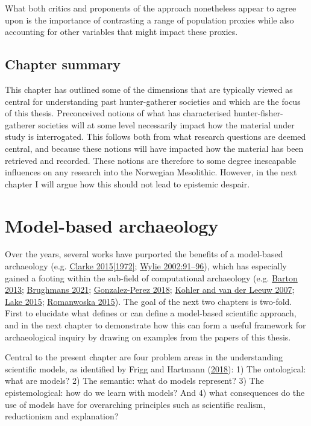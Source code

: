 \documentclass[
  12pt,
  a4paper,
  oneside]{book}
\begin{document}
What both critics and proponents of the approach nonetheless appear to agree upon is the importance of contrasting a range of population proxies while also accounting for other variables that might impact these proxies.

\hypertarget{chapter-summary-1}{%
\section{Chapter summary}\label{chapter-summary-1}}

This chapter has outlined some of the dimensions that are typically viewed as central for understanding past hunter-gatherer societies and which are the focus of this thesis. Preconceived notions of what has characterised hunter-fisher-gatherer societies will at some level necessarily impact how the material under study is interrogated. This follows both from what research questions are deemed central, and because these notions will have impacted how the material has been retrieved and recorded. These notions are therefore to some degree inescapable influences on any research into the Norwegian Mesolithic. However, in the next chapter I will argue how this should not lead to epistemic despair.

\hypertarget{model-based-archaeology}{%
\chapter{Model-based archaeology}\label{model-based-archaeology}}

Over the years, several works have purported the benefits of a model-based archaeology (e.g. \protect\hyperlink{ref-clarke1972}{Clarke 2015{[}1972{]}}; \protect\hyperlink{ref-wylie2002}{Wylie 2002:91--96}), which has especially gained a footing within the sub-field of computational archaeology (e.g. \protect\hyperlink{ref-barton2013}{Barton 2013}; \protect\hyperlink{ref-brughmans2021}{Brughmans 2021}; \protect\hyperlink{ref-gonzalez-perez2018}{Gonzalez-Perez 2018}; \protect\hyperlink{ref-kohler2007}{Kohler and van der Leeuw 2007}; \protect\hyperlink{ref-lake2015}{Lake 2015}; \protect\hyperlink{ref-romanowska2015}{Romanwoska 2015}). The goal of the next two chapters is two-fold. First to elucidate what defines or can define a model-based scientific approach, and in the next chapter to demonstrate how this can form a useful framework for archaeological inquiry by drawing on examples from the papers of this thesis.

Central to the present chapter are four problem areas in the understanding scientific models, as identified by Frigg and Hartmann (\protect\hyperlink{ref-frigg2018}{2018}): 1) The ontological: what are models? 2) The semantic: what do models represent? 3) The epistemological: how do we learn with models? And 4) what consequences do the use of models have for overarching principles such as scientific realism, reductionism and explanation?
\end{document}

